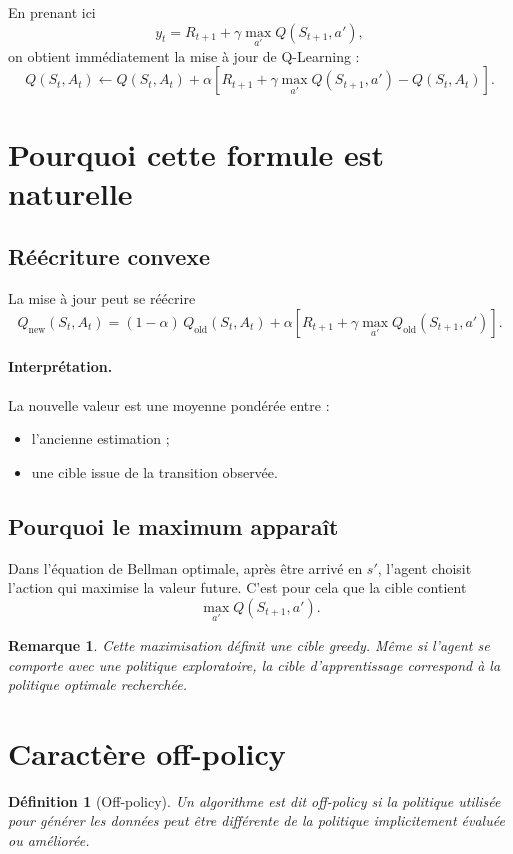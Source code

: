 \documentclass[11pt,a4paper]{article}
\newtheorem*{definition}{Définition}
\newtheorem*{remarque}{Remarque}
\begin{document}
En prenant ici
\[
y_t = R_{t+1}+\gamma \max_{a'} Q(S_{t+1},a'),
\]
on obtient immédiatement la mise à jour de Q-Learning :
\[
Q(S_t,A_t)\leftarrow Q(S_t,A_t)+\alpha\left[R_{t+1}+\gamma \max_{a'}Q(S_{t+1},a')-Q(S_t,A_t)\right].
\]

\section{Pourquoi cette formule est naturelle}

\subsection{Réécriture convexe}

La mise à jour peut se réécrire
\[
Q_{\text{new}}(S_t,A_t)
=
(1-\alpha)\,Q_{\text{old}}(S_t,A_t)
+
\alpha \left[R_{t+1}+\gamma\max_{a'}Q_{\text{old}}(S_{t+1},a')\right].
\]

\paragraph{Interprétation.}
La nouvelle valeur est une moyenne pondérée entre :
\begin{itemize}[leftmargin=1.6em]
    \item l'ancienne estimation ;
    \item une cible issue de la transition observée.
\end{itemize}

\subsection{Pourquoi le maximum apparaît}

Dans l'équation de Bellman optimale, après être arrivé en $s'$, l'agent choisit l'action qui maximise la valeur future. C'est pour cela que la cible contient
\[
\max_{a'}Q(S_{t+1},a').
\]

\begin{remarque}
Cette maximisation définit une cible \emph{greedy}. Même si l'agent se comporte avec une politique exploratoire, la cible d'apprentissage correspond à la politique optimale recherchée.
\end{remarque}

\section{Caractère off-policy}

\begin{definition}[Off-policy]
Un algorithme est dit off-policy si la politique utilisée pour générer les données peut être différente de la politique implicitement évaluée ou améliorée.
\end{definition}
\end{document}
